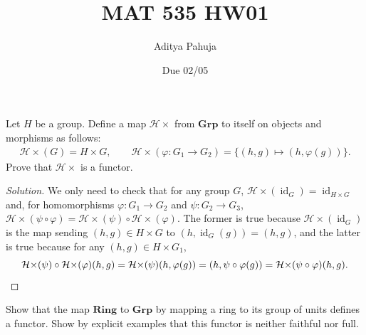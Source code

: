 \documentclass[10pt]{article}
\title{MAT 535 HW01}
\author{\large Aditya Pahuja}
\date{\large Due 02/05}
\newenvironment{soln}{\begin{proof}[Solution]}{\end{proof}}
\begin{document}
\maketitle

\newcommand{\Hx}{\mathcal H{\times}}
\newcommand{\Kx}{\mathcal K{\times}}
\begin{problem}
    [Appendix II \S1 \#2]
    Let $H$ be a group. Define a map $\Hx$
    from $\mathbf{Grp}$ to itself on objects and morphisms as follows:
    \begin{gather*}
        \Hx(G) = H\times G,\qquad
	\Hx(\varphi\colon G_1\to G_2) =
	\{(h,g)\mapsto(h,\varphi(g))\}.
    \end{gather*}
    Prove that $\Hx$ is a functor.
\end{problem}

\begin{soln}
    We only need to check that for any group $G$,
    $\Hx(\operatorname{id}_G) = \operatorname{id}_{H\times G}$
    and, for homomorphisms $\varphi\colon G_1\to G_2$
    and $\psi\colon G_2\to G_3$, $\Hx(\psi\circ\varphi)
    = \Hx(\psi)\circ\Hx(\varphi)$. The former is true because
    $\Hx(\operatorname{id}_G)$ is the map sending
    $(h,g)\in H\times G$ to $(h,\operatorname{id}_G(g)) = (h,g)$,
    and the latter is true because for any $(h,g)\in H\times G_1$,
    \begin{equation*}
        \Hx(\psi)\circ\Hx(\varphi)(h,g)
	= \Hx(\psi)(h,\varphi(g))
	= (h,\psi\circ\varphi(g))
	= \Hx(\psi\circ\varphi)(h,g).\qedhere
    \end{equation*}
\end{soln}

\begin{problem}
    [Appendix II \S1 \#3]
    Show that the map $\mathbf{Ring}$ to $\mathbf{Grp}$
    by mapping a ring to its group of units defines a functor.
    Show by explicit examples that this functor is neither faithful nor full.
\end{problem}
\end{document}
